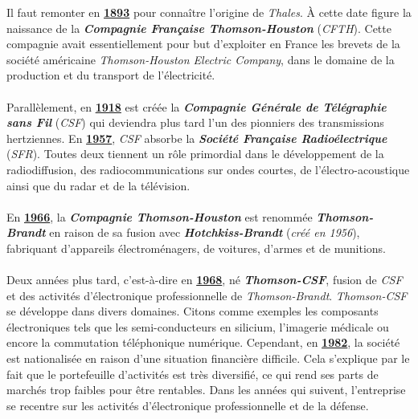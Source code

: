 \documentclass[10pt, oneside, a4paper]{article}
\begin{document}
\hspace{-0.5 cm}Il faut remonter en \underline{\textbf{1893}} pour connaître l'origine de \textit{Thales}. À cette date figure la naissance de la \textbf{\textit{Compagnie Française Thomson-Houston}} (\textit{CFTH}). Cette compagnie avait essentiellement pour but d'exploiter en France les brevets de la société américaine \textit{Thomson-Houston Electric Company}, dans le domaine de la production et du transport de l'électricité. \\ \\
Parallèlement, en \underline{\textbf{1918}} est créée la \textbf{\textit{Compagnie Générale de Télégraphie sans Fil}} (\textit{CSF}) qui deviendra plus tard l'un des pionniers des transmissions hertziennes. En \underline{\textbf{1957}}, \textit{CSF} absorbe la \textbf{\textit{Société Française Radioélectrique}} (\textit{SFR}). Toutes deux tiennent un rôle primordial dans le développement de la radiodiffusion, des radiocommunications sur ondes courtes, de l'électro-acoustique ainsi que du radar et de la télévision. \\ \\
En \underline{\textbf{1966}}, la \textbf{\textit{Compagnie Thomson-Houston}} est renommée \textbf{\textit{Thomson-Brandt}} en raison de sa fusion avec \textbf{\textit{Hotchkiss-Brandt}} (\textit{créé en 1956}), fabriquant d'appareils électroménagers, de voitures, d'armes et de munitions. \\ \\
Deux années plus tard, c'est-à-dire en \underline{\textbf{1968}}, né \textbf{\textit{Thomson-CSF}}, fusion de \textit{CSF} et des activités d'électronique professionnelle de \textit{Thomson-Brandt}. \textit{Thomson-CSF} se développe dans divers domaines. Citons comme exemples les composants électroniques tels que les semi-conducteurs en silicium, l'imagerie médicale ou encore la commutation téléphonique numérique. Cependant, en \underline{\textbf{1982}}, la société est nationalisée en raison d’une situation financière difficile. Cela s’explique par le fait que le portefeuille d’activités est très diversifié, ce qui rend ses parts de marchés trop faibles pour être rentables. Dans les années qui suivent, l’entreprise se recentre sur les activités d’électronique professionnelle et de la défense. \\ \\
\end{document}
